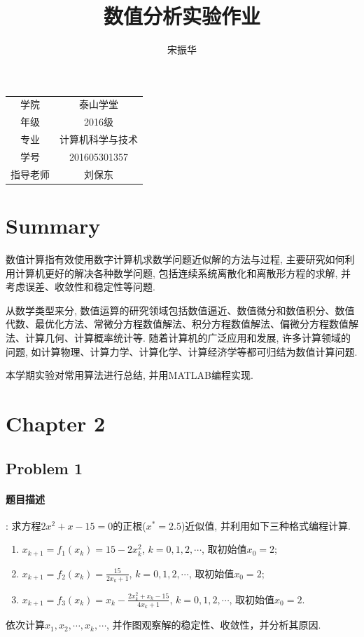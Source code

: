 \documentclass{article}
\begin{document}
\begin{CJK*}{UTF8}{song}
\title{数值分析实验作业}
\author{宋振华}
\maketitle
\begin{center}
\begin{tabular}{cc}
	学院& 泰山学堂 \\
	年级& 2016级 \\
	专业& 计算机科学与技术 \\
	学号& 201605301357 \\
	指导老师& 刘保东 
\end{tabular}
	
\end{center}
\clearpage
\tableofcontents
\clearpage
	\section{Summary}
	
		数值计算指有效使用数字计算机求数学问题近似解的方法与过程, 主要研究如何利用计算机更好的解决各种数学问题, 包括连续系统离散化和离散形方程的求解, 并考虑误差、收敛性和稳定性等问题.
		
		从数学类型来分, 数值运算的研究领域包括数值逼近、数值微分和数值积分、数值代数、最优化方法、常微分方程数值解法、积分方程数值解法、偏微分方程数值解法、计算几何、计算概率统计等. 随着计算机的广泛应用和发展, 许多计算领域的问题, 如计算物理、计算力学、计算化学、计算经济学等都可归结为数值计算问题.
		
		本学期实验对常用算法进行总结, 并用MATLAB编程实现.
	\section{Chapter 2}
		\subsection{Problem 1}
			\paragraph{题目描述}
				:\newline
				求方程$2x^2 + x - 15 = 0$的正根($x^{*}=2.5$)近似值, 并利用如下三种格式编程计算.
				\begin{enumerate}
					\item $x_{k+1} = f_1\left(x_k\right) = 15 - 2 x_k^2$, $k=0,1,2,\cdots$, 取初始值$x_0=2$;
					\item $x_{k+1} = f_2\left(x_k\right) = \frac{15}{2x_k+1}$, $k=0,1,2,\cdots$, 取初始值$x_0=2$;
					\item $x_{k+1} = f_3\left(x_k\right) = x_k - \frac{2x_k^2+x_k-15}{4x_k+1}$, $k=0,1,2,\cdots$, 取初始值$x_0=2$.
				\end{enumerate}
				依次计算$x_1,x_2,\cdots,x_k,\cdots$, 并作图观察解的稳定性、收敛性，并分析其原因.
			

\end{CJK*}
\end{document}
